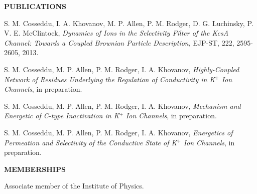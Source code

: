 \documentclass[a4paper,10pt,final]{memoir}
\newcommand{\Sep}{\vspace{1em}}
\newcommand{\SmallSep}{\vspace{0.4em}}
\newcommand{\CVSection}[1]
	{\Large\textbf{#1}\par
	\SmallSep\normalsize\normalfont}
\begin{document}
\Sep
\CVSection{PUBLICATIONS} 
\begin{compactitem}[\color{RoyalBlue}$\circ$]
\item S. M. Cosseddu, I. A. Khovanov, M. P. Allen, P. M. Rodger, D. G. Luchinsky,
  P. V. E. McClintock, \textit{Dynamics of Ions in the Selectivity Filter of the KcsA
    Channel: Towards a Coupled Brownian Particle Description}, EJP-ST, 222, 2595-2605,
  2013.
\item S. M. Cosseddu, M. P. Allen, P. M. Rodger, I. A. Khovanov, \textit{Highly-Coupled Network of
    Residues Underlying the Regulation of Conductivity in K$^+$ Ion Channels}, in preparation.
\item S. M. Cosseddu, M. P. Allen, P. M. Rodger, I. A. Khovanov, \textit{Mechanism and Energetic
  of C-type Inactivation in K$^+$ Ion Channels}, in preparation.
\item S. M. Cosseddu, M. P. Allen, P. M. Rodger, I. A. Khovanov, \textit{Energetics of
    Permeation and Selectivity of the Conductive State of K$^+$ Ion Channels}, in
  preparation.
\end{compactitem}

\Sep
\CVSection{MEMBERSHIPS} 
Associate member of the Institute of Physics. 

\end{document}
